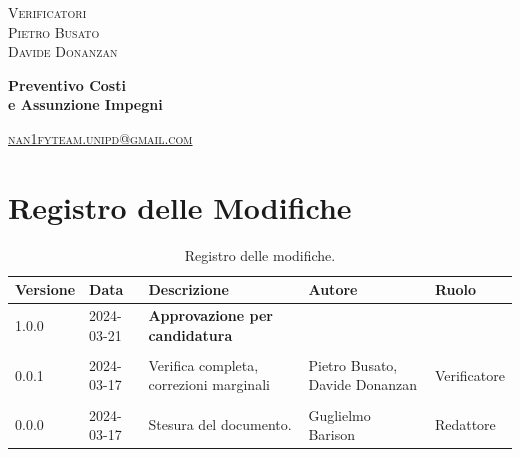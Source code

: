 \documentclass[8pt]{article}
\begin{document}
\begin{titlepage}
\begin{minipage}[t]{0.47\textwidth}
		{\large{\textsc{Verificatori}}
			\vspace{3mm}
			{\\\large{\textsc{Pietro Busato}\\}} %
			{\large{\textsc{Davide Donanzan}}}
			
		}
		\vspace{4mm}\vspace{4mm}
	\end{minipage}
	\vspace{4cm}
	\begin{center}
		\begin{flushright}
			{\fontsize{30pt}{52pt}\selectfont \textbf{Preventivo Costi \\e Assunzione Impegni\\}} %
		\end{flushright}
		\vspace{3cm}
	\end{center}
	\vspace{8.5 cm}
	{\small \textsc{\href{mailto: nan1fyteam.unipd@gmail.com}{nan1fyteam.unipd@gmail.com}}}
\end{titlepage}
\pagestyle{mystyle}
\section*{Registro delle Modifiche}
\begin{table}[ht!]	
	\centering
	\begin{tabular}{p{1.2cm} p{2cm} p{6cm} p{3cm} p{2cm}}
		\toprule
		\textbf{Versione}& \textbf{Data} & \textbf{Descrizione} & \textbf{Autore} & \textbf{Ruolo} \\
		\midrule
		1.0.0 & 2024-03-21 & \textbf{Approvazione per candidatura} & &  \\\\
		0.0.1 & 2024-03-17 & Verifica completa, correzioni marginali  & Pietro Busato, Davide Donanzan & Verificatore \\\\
		0.0.0 & 2024-03-17 & Stesura del documento.  & Guglielmo Barison & Redattore \\
		\bottomrule
	\end{tabular}
	\caption{Registro delle modifiche.}
	\label{table:Registro delle modifiche}
\end{table}
\newpage
\tableofcontents
\clearpage
\newpage
\justifying
\end{document}

